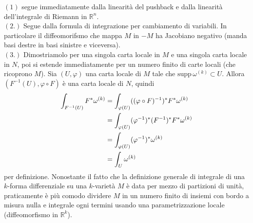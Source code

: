 \documentclass[twoside, 11pt]{amsbook}
\makeatletter
\newcommand{\0}{{(0)}}
\newcommand{\3}{{(3)}}
\theoremstyle{colonplain}
\theoremstyle{colondefinition}
\theoremstyle{colonremark}
\numberwithin{equation}{chapter}
\renewcommand{\proofname}{Dimostrazione}
\renewenvironment{proof}[1][\proofname]{\par
  \pushQED{\qed}%
  \normalfont \topsep6\p@\@plus6\p@\relax
  \trivlist
  \item[\hskip\labelsep\bfseries #1:]\ignorespaces
}{%
  \popQED\endtrivlist\@endpefalse
}
\makeatother
\begin{document}
\begin{proof} $(1)$ segue immediatamente dalla linearità del pushback e dalla linearità dell'integrale di Riemann in $\mathbb{R}^n$. \\
$(2.)$ Segue dalla formula di integrazione per cambiamento di variabili. In particolare il diffeomorifsmo che mappa $M$ in $-M$ ha Jacobiano negativo (manda basi destre in basi sinistre e viceversa). \\
$(3.)$ Dimostriamolo per una singola carta locale in $M$ e una singola carta locale in $N$, poi si estende immediatamente per un numero finito di carte locali (che ricoprono $M$). Sia $(U, \varphi)$ una carta locale di $M$ tale che $\mathrm{supp} \, \omega^{(k)} \subset U$. Allora $(F^{-1}(U), \varphi \circ F)$ è una carta locale di $N$, quindi
\begin{align}
    \int_{F^{-1}(U)} F^*\omega^{(k)} &= \int_{\varphi(U)} ((\varphi \circ F)^{-1})^*F^*\omega^{(k)} \notag \\
    &= \int_{\varphi(U)} (\varphi^{-1})^*(F^{-1})^*F^*\omega^{(k)} \notag \\
    &= \int_{\varphi(U)} (\varphi^{-1})^*\omega^{(k)} \notag \\
    &= \int_U \omega^{(k)}
\end{align}
per definizione.
\end{proof}
Nonostante il fatto che la definizione generale di integrale di una $k$-forma differenziale su una $k$-varietà $M$ è data per mezzo di partizioni di unità, praticamente è più comodo dividere $M$ in un numero finito di insiemi con bordo a misura nulla e integrale ogni termini usando una parametrizzazione locale (diffeomorfismo in $\mathbb{R}^k$).
\end{document}
